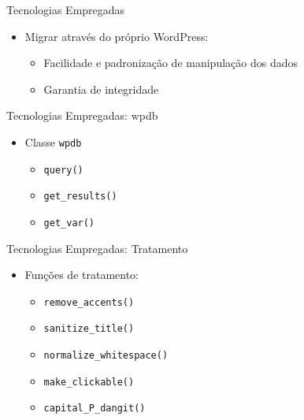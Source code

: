\documentclass{beamer}
\begin{document}
\begin{frame}{Tecnologias Empregadas}
  \begin{itemize}
    \pause \item Migrar através do próprio WordPress:
    \begin{itemize}
      \pause \item Facilidade e padronização de manipulação dos dados
      \pause \item Garantia de integridade
    \end{itemize}
  \end{itemize}
\end{frame}

\begin{frame}{Tecnologias Empregadas: wpdb}
  \begin{itemize}
    \pause \item Classe \texttt{wpdb}
    \begin{itemize}
      \pause \item \texttt{query()}
      \pause \item \texttt{get\_results()}
      \pause \item \texttt{get\_var()}
    \end{itemize}
  \end{itemize}
\end{frame}

\begin{frame}{Tecnologias Empregadas: Tratamento}
  \begin{itemize}
    \pause \item Funções de tratamento:
    \begin{itemize}
      \pause \item \texttt{remove\_accents()}
      \pause \item \texttt{sanitize\_title()}
      \pause \item \texttt{normalize\_whitespace()}
      \pause \item \texttt{make\_clickable()}
      \pause \item \texttt{capital\_P\_dangit()}
    \end{itemize}
  \end{itemize}
\end{frame}
\end{document}

